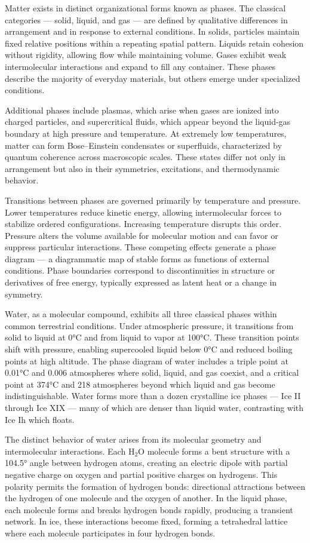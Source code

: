 Matter exists in distinct organizational forms known as phases. The classical categories — solid, liquid, and gas — are defined by qualitative differences in arrangement and in response to external conditions. In solids, particles maintain fixed relative positions within a repeating spatial pattern. Liquids retain cohesion without rigidity, allowing flow while maintaining volume. Gases exhibit weak intermolecular interactions and expand to fill any container. These phases describe the majority of everyday materials, but others emerge under specialized conditions.

Additional phases include plasmas, which arise when gases are ionized into charged particles, and supercritical fluids, which appear beyond the liquid-gas boundary at high pressure and temperature. At extremely low temperatures, matter can form Bose–Einstein condensates or superfluids, characterized by quantum coherence across macroscopic scales. These states differ not only in arrangement but also in their symmetries, excitations, and thermodynamic behavior.

Transitions between phases are governed primarily by temperature and pressure. Lower temperatures reduce kinetic energy, allowing intermolecular forces to stabilize ordered configurations. Increasing temperature disrupts this order. Pressure alters the volume available for molecular motion and can favor or suppress particular interactions. These competing effects generate a phase diagram — a diagrammatic map of stable forms as functions of external conditions. Phase boundaries correspond to discontinuities in structure or derivatives of free energy, typically expressed as latent heat or a change in symmetry.

Water, as a molecular compound, exhibits all three classical phases within common terrestrial conditions. Under atmospheric pressure, it transitions from solid to liquid at 0°C and from liquid to vapor at 100°C. These transition points shift with pressure, enabling supercooled liquid below 0°C and reduced boiling points at high altitude. The phase diagram of water includes a triple point at 0.01°C and 0.006 atmospheres where solid, liquid, and gas coexist, and a critical point at 374°C and 218 atmospheres beyond which liquid and gas become indistinguishable. Water forms more than a dozen crystalline ice phases — Ice II through Ice XIX — many of which are denser than liquid water, contrasting with Ice Ih which floats.

The distinct behavior of water arises from its molecular geometry and intermolecular interactions. Each H\(_2\)O molecule forms a bent structure with a 104.5° angle between hydrogen atoms, creating an electric dipole with partial negative charge on oxygen and partial positive charges on hydrogens. This polarity permits the formation of hydrogen bonds: directional attractions between the hydrogen of one molecule and the oxygen of another. In the liquid phase, each molecule forms and breaks hydrogen bonds rapidly, producing a transient network. In ice, these interactions become fixed, forming a tetrahedral lattice where each molecule participates in four hydrogen bonds.

